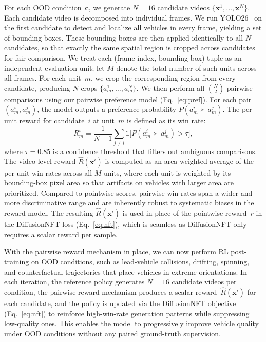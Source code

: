 \documentclass[runningheads]{llncs}
\begin{document}
For each OOD condition~$\mathbf{c}$, we generate $N\!=\!16$ candidate videos $\{\mathbf{x}^1,\ldots,\mathbf{x}^N\}$.  Each candidate video is decomposed into individual frames.  We run YOLO26~\cite{sapkota2025yolo26} on the first candidate to detect and localize all vehicles in every frame, yielding a set of bounding boxes.  These bounding boxes are then applied identically to all $N$ candidates, so that exactly the same spatial region is cropped across candidates for fair comparison.  We treat each (frame index, bounding box) tuple as an independent evaluation unit; let $M$ denote the total number of such units across all frames.  For each unit~$m$, we crop the corresponding region from every candidate, producing $N$ crops $\{a_m^1,\ldots,a_m^N\}$.  We then perform all $\binom{N}{2}$ pairwise comparisons using our pairwise preference model (Eq.~\ref{eq:pref}).  For each pair $(a_m^i,a_m^j)$, the model outputs a preference probability $P(a_m^i\!\succ\!a_m^j)$.  The per-unit reward for candidate~$i$ at unit~$m$ is defined as its win rate:
%
\begin{equation}
  R_m^i
  = \frac{1}{N-1}\sum_{j\neq i}
    \mathds{1}\!\Big[P(a_m^i\!\succ\!a_m^j)>\tau\Big],
  \label{eq:winrate}
\end{equation}
%
where $\tau\!=\!0.85$ is a confidence threshold that filters out ambiguous comparisons.  The video-level reward $\hat{R}(\mathbf{x}^i)$ is computed as an area-weighted average of the per-unit win rates across all $M$ units, where each unit is weighted by its bounding-box pixel area so that artifacts on vehicles with larger area are prioritized.  Compared to pointwise scores, pairwise win rates span a wider and more discriminative range and are inherently robust to systematic biases in the reward model.  The resulting $\hat{R}(\mathbf{x}^i)$ is used in place of the pointwise reward~$r$ in the DiffusionNFT loss (Eq.~\ref{eq:nft}), which is seamless as DiffusionNFT only requires a scalar reward per sample. 

With the pairwise reward mechanism in place, we can now perform RL post-training on OOD conditions, such as lead-vehicle collisions, drifting, spinning, and counterfactual trajectories that place vehicles in extreme orientations. In each iteration, the reference policy generates $N\!=\!16$ candidate videos per condition, the pairwise reward mechanism produces a scalar reward~$\hat{R}(\mathbf{x}^i)$ for each candidate, and the policy is updated via the DiffusionNFT objective (Eq.~\ref{eq:nft}) to reinforce high-win-rate generation patterns while suppressing low-quality ones.  This enables the model to progressively improve vehicle quality under OOD conditions without any paired ground-truth supervision.
\end{document}
